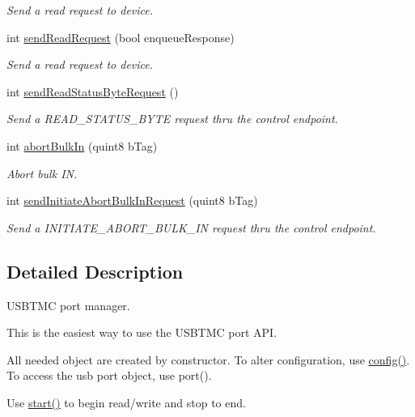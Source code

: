 \begin{DoxyCompactItemize}
\begin{DoxyCompactList}\small\item\em Send a read request to device. \end{DoxyCompactList}\item 
int \hyperlink{classmdt_usbtmc_port_manager_ab1604a1c8f2e9192714d039dbf9a5158}{sendReadRequest} (bool enqueueResponse)
\begin{DoxyCompactList}\small\item\em Send a read request to device. \end{DoxyCompactList}\item 
int \hyperlink{classmdt_usbtmc_port_manager_a7bcc280bd4a26ed523832550b1e61553}{sendReadStatusByteRequest} ()
\begin{DoxyCompactList}\small\item\em Send a READ\_\-STATUS\_\-BYTE request thru the control endpoint. \end{DoxyCompactList}\item 
int \hyperlink{classmdt_usbtmc_port_manager_ae845b25c292e83ef9fe01640867c7116}{abortBulkIn} (quint8 bTag)
\begin{DoxyCompactList}\small\item\em Abort bulk IN. \end{DoxyCompactList}\item 
int \hyperlink{classmdt_usbtmc_port_manager_ad52e35820d576a9dba9dc33feacb0202}{sendInitiateAbortBulkInRequest} (quint8 bTag)
\begin{DoxyCompactList}\small\item\em Send a INITIATE\_\-ABORT\_\-BULK\_\-IN request thru the control endpoint. \end{DoxyCompactList}\end{DoxyCompactItemize}


\subsection{Detailed Description}
USBTMC port manager. 

This is the easiest way to use the USBTMC port API.

All needed object are created by constructor. To alter configuration, use \hyperlink{classmdt_port_manager_a9cf3ea2da38f81682695b37448712ffd}{config()}. To access the usb port object, use port().

Use \hyperlink{classmdt_port_manager_af1fb103ffafc227337a59c7e82f44fbc}{start()} to begin read/write and stop to end. 

